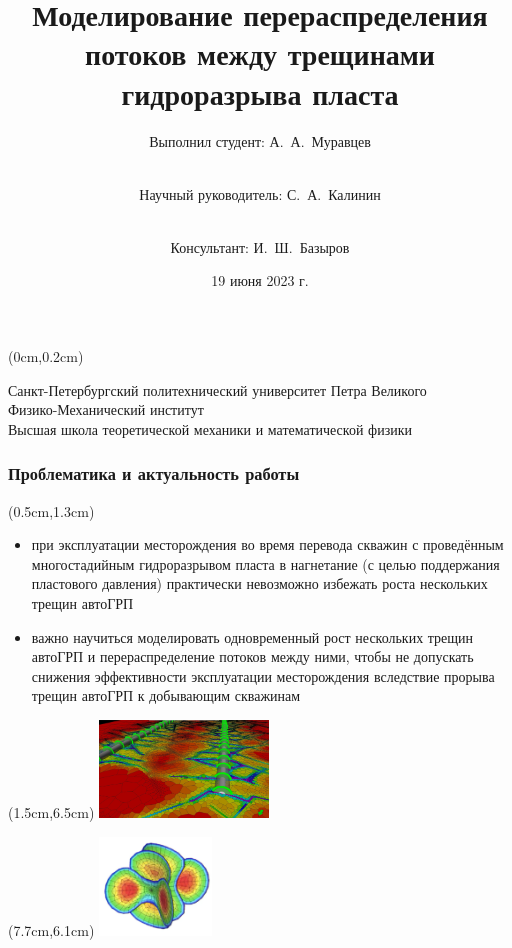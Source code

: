 \documentclass{beamer}
\title{Моделирование перераспределения потоков между трещинами гидроразрыва пласта}
\subtitle{}
\author{Выполнил студент: А.~А.~Муравцев\and \\Научный руководитель: С.~А.~Калинин\and \\Консультант: И.~Ш.~Базыров}
\date{19 июня 2023 г.}
\begin{document}
\begin{frame}
\vspace*{20mm}
\titlepage

\begin{textblock*}{128mm}(0cm,0.2cm)
\begin{center}
Санкт-Петербургский политехнический	университет Петра Великого\\
Физико-Механический институт\\
Высшая школа теоретической механики и математической физики
\end{center}
\end{textblock*}

\end{frame}


\begin{frame}
\frametitle{Проблематика и актуальность работы}

\begin{textblock*}{10.5cm}(0.5cm,1.3cm)
\begin{itemize}
	\item при эксплуатации месторождения во время перевода скважин с проведённым многостадийным гидроразрывом пласта в нагнетание (с целью поддержания пластового давления) практически невозможно избежать роста нескольких трещин автоГРП
	\item важно научиться моделировать одновременный рост нескольких трещин автоГРП и перераспределение потоков между ними, чтобы не допускать снижения эффективности эксплуатации месторождения вследствие прорыва трещин автоГРП к добывающим скважинам 
\end{itemize}
\end{textblock*}

\begin{textblock*}{4.5cm}(1.5cm,6.5cm)
\includegraphics[width=4.5cm]{hydraulic_fracturing_abstract_image1.jpeg}
\end{textblock*}

\begin{textblock*}{4cm}(7.7cm,6.1cm)
\includegraphics[width=3cm]{hydraulic_fracturing_abstract_image2.jpg}
\end{textblock*}

\end{frame}
\end{document}
